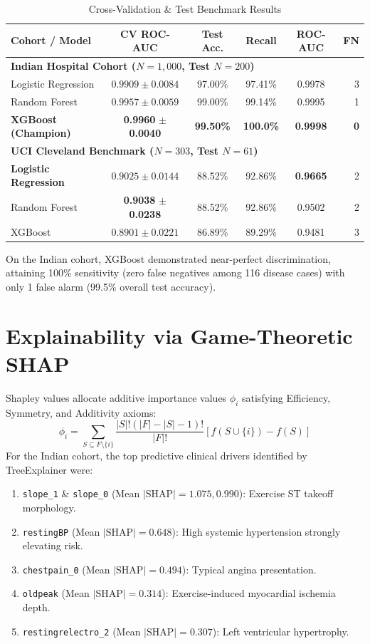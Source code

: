 \documentclass[journal]{IEEEtran}
\begin{document}
\begin{table}[htbp]
\caption{Cross-Validation \& Test Benchmark Results}
\label{tab:results}
\centering
\begin{tabular}{lccccr}
\toprule
\textbf{Cohort / Model} & \textbf{CV ROC-AUC} & \textbf{Test Acc.} & \textbf{Recall} & \textbf{ROC-AUC} & \textbf{FN} \\
\midrule
\multicolumn{6}{l}{\textbf{Indian Hospital Cohort ($N=1,000$, Test $N=200$)}} \\
Logistic Regression & $0.9909 \pm 0.0084$ & 97.00\% & 97.41\% & 0.9978 & 3 \\
Random Forest & $0.9957 \pm 0.0059$ & 99.00\% & 99.14\% & 0.9995 & 1 \\
\textbf{XGBoost (Champion)} & \textbf{0.9960} $\pm$ \textbf{0.0040} & \textbf{99.50\%} & \textbf{100.0\%} & \textbf{0.9998} & \textbf{0} \\
\midrule
\multicolumn{6}{l}{\textbf{UCI Cleveland Benchmark ($N=303$, Test $N=61$)}} \\
\textbf{Logistic Regression} & $0.9025 \pm 0.0144$ & 88.52\% & 92.86\% & \textbf{0.9665} & 2 \\
Random Forest & \textbf{0.9038} $\pm$ \textbf{0.0238} & 88.52\% & 92.86\% & 0.9502 & 2 \\
XGBoost & $0.8901 \pm 0.0221$ & 86.89\% & 89.29\% & 0.9481 & 3 \\
\bottomrule
\end{tabular}
\end{table}

On the Indian cohort, XGBoost demonstrated near-perfect discrimination, attaining 100\% sensitivity (zero false negatives among 116 disease cases) with only 1 false alarm (99.5\% overall test accuracy).

\section{Explainability via Game-Theoretic SHAP}
Shapley values allocate additive importance values $\phi_i$ satisfying Efficiency, Symmetry, and Additivity axioms:
$$\phi_i = \sum_{S \subseteq F \setminus \{i\}} \frac{|S|!(|F|-|S|-1)!}{|F|!} [f(S \cup \{i\}) - f(S)]$$
For the Indian cohort, the top predictive clinical drivers identified by TreeExplainer were:
\begin{enumerate}
    \item \texttt{slope\_1} \& \texttt{slope\_0} (Mean $|\text{SHAP}| = 1.075, 0.990$): Exercise ST takeoff morphology.
    \item \texttt{restingBP} (Mean $|\text{SHAP}| = 0.648$): High systemic hypertension strongly elevating risk.
    \item \texttt{chestpain\_0} (Mean $|\text{SHAP}| = 0.494$): Typical angina presentation.
    \item \texttt{oldpeak} (Mean $|\text{SHAP}| = 0.314$): Exercise-induced myocardial ischemia depth.
    \item \texttt{restingrelectro\_2} (Mean $|\text{SHAP}| = 0.307$): Left ventricular hypertrophy.
\end{enumerate}
\end{document}
